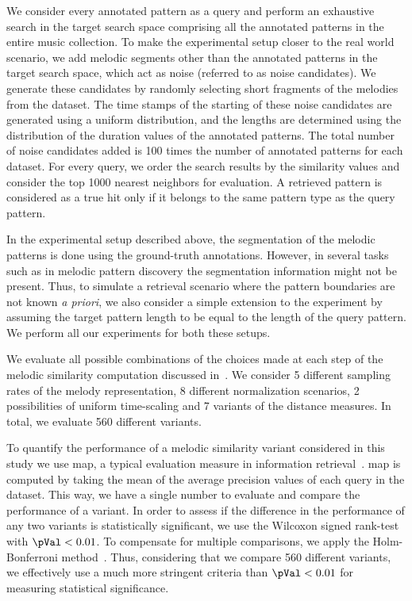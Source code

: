 We consider every annotated pattern as a query and perform an exhaustive search in the target search space comprising all the annotated patterns in the entire music collection. To make the experimental setup closer to the real world scenario, we add melodic segments other than the annotated patterns in the target search space, which act as noise (referred to as noise candidates). We generate these candidates by randomly selecting short fragments of the melodies from the dataset. The time stamps of the starting of these noise candidates are generated using a uniform distribution, and the lengths are determined using the distribution of the duration values of the annotated patterns. The total number of noise candidates added is 100 times the number of annotated patterns for each dataset. For every query, we order the search results by the similarity values and consider the top 1000 nearest neighbors for evaluation. A retrieved pattern is considered as a true hit only if it belongs to the same pattern type as the query pattern. 

In the experimental setup described above, the segmentation of the melodic patterns is done using the ground-truth annotations. However, in several tasks such as in melodic pattern discovery the segmentation information might not be present. Thus, to simulate a retrieval scenario where the pattern boundaries are not known \textit{a priori}, we also consider a simple extension to the experiment by assuming the target pattern length to be equal to the length of the query pattern. We perform all our experiments for both these setups. 

We evaluate all possible combinations of the choices made at each step of the melodic similarity computation discussed in~. We consider 5 different sampling rates of the melody representation, 8 different normalization scenarios, 2 possibilities of uniform time-scaling and 7 variants of the distance measures. In total, we evaluate 560 different variants.

To quantify the performance of a melodic similarity variant considered in this study we use \acrfull{map}, a typical evaluation measure in information retrieval~\citep{manning2008introduction}. \Gls{map} is computed by taking the mean of the average precision values of each query in the dataset. This way, we have a single number to evaluate and compare the performance of a variant. In order to assess if the difference in the performance of any two variants is statistically significant, we use the Wilcoxon signed rank-test~\citep{wilcoxon1945individual} with $\pVal < 0.01$. To compensate for multiple comparisons, we apply the Holm-Bonferroni method~\citep{holm1979simple}. Thus, considering that we compare 560 different variants, we effectively use a much more stringent criteria than $\pVal < 0.01$ for measuring statistical significance.


